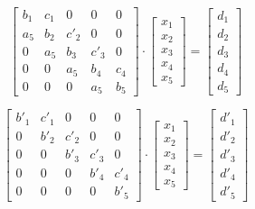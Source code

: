 \documentclass[12pt]{CLASS/protokol}
\begin{document}
        \begin{equation}\label{eq:U+L}
            \begin{bmatrix}
                b_1 & c_1 & 0 & 0 & 0 \\
                a_5 & b_2 & c'_2 & 0 & 0 \\
                0 & a_5 & b_3 & c'_3 & 0 \\
                0 & 0 & a_5 & b_4 & c_4 \\
                0 & 0 & 0 & a_5 & b_5
            \end{bmatrix} \cdot
            \begin{bmatrix}
                x_1 \\
                x_2 \\
                x_3 \\
                x_4 \\
                x_5
            \end{bmatrix}  =
            \begin{bmatrix}
                d_1 \\
                d_2 \\
                d_3 \\
                d_4 \\
                d_5
            \end{bmatrix}
        \end{equation}

        \begin{equation}\label{eq:Upper}
            \begin{bmatrix}
                b'_1 & c'_1 & 0 & 0 & 0 \\
                0 & b'_2 & c'_2 & 0 & 0 \\
                0 & 0 & b'_3 & c'_3 & 0 \\
                0 & 0 & 0 & b'_4 & c'_4 \\
                0 & 0 & 0 & 0 & b'_5
            \end{bmatrix} \cdot
            \begin{bmatrix}
                x_1 \\
                x_2 \\
                x_3 \\
                x_4 \\
                x_5
            \end{bmatrix}  =
            \begin{bmatrix}
                d'_1 \\
                d'_2 \\
                d'_3 \\
                d'_4 \\
                d'_5
            \end{bmatrix}
        \end{equation}
\end{document}
